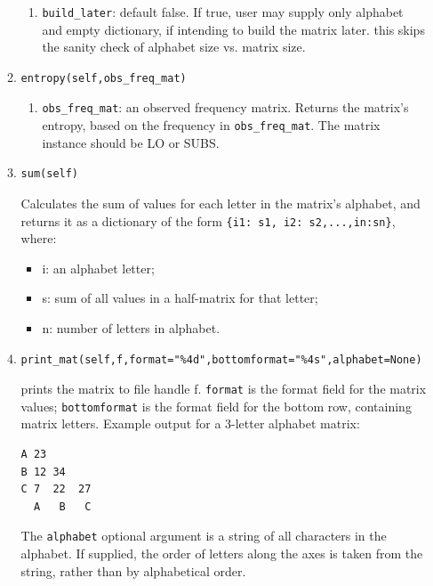 \documentclass{report}
\begin{document}
\begin{enumerate}
\begin{enumerate}
\begin{enumerate}
      \item \verb|build_later|: default false. If true, user may supply only alphabet and empty dictionary, if intending to build the matrix later. this skips the sanity check of alphabet size vs. matrix size.

    \end{enumerate}

    \item
\begin{verbatim}
entropy(self,obs_freq_mat)
\end{verbatim}

    \begin{enumerate}
      \item \verb|obs_freq_mat|: an observed frequency matrix. Returns the matrix's entropy, based on the frequency in  \verb|obs_freq_mat|. The matrix instance should be LO or SUBS.
    \end{enumerate}

    \item
\begin{verbatim}
sum(self)
\end{verbatim}
    Calculates the sum of values for each letter in the matrix's alphabet, and returns it as a dictionary of the form \verb|{i1: s1, i2: s2,...,in:sn}|, where:
    \begin{itemize}
      \item i: an alphabet letter;
      \item s: sum of all values in a half-matrix for that letter;
      \item n: number of letters in alphabet.
    \end{itemize}

    \item
\begin{verbatim}
print_mat(self,f,format="%4d",bottomformat="%4s",alphabet=None)
\end{verbatim}

    prints the matrix to file handle f. \verb|format| is the format field for the matrix values; \verb|bottomformat| is the format field for the bottom row, containing matrix letters. Example output for a 3-letter alphabet matrix:

\begin{verbatim}
A 23
B 12 34
C 7  22  27
  A   B   C
\end{verbatim}

    The \verb|alphabet| optional argument is a string of all characters in the alphabet. If supplied, the order of letters along the axes is taken from the string, rather than by alphabetical order.


\end{enumerate}
\end{enumerate}
\end{document}
